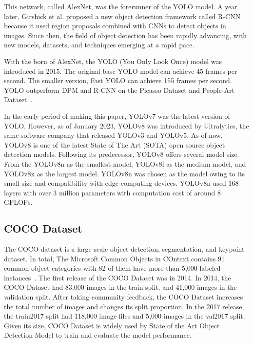 \documentclass[conference]{IEEEtran}
\begin{document}
This network, called AlexNet, was the forerunner of the YOLO model.
A year later, Girshick et al. \@ proposed a new object detection framework called R-CNN~\cite{b3} because it used region proposals combined with CNNs to detect objects in images.
Since then, the field of object detection has been rapidly advancing, with new models, datasets, and techniques emerging at a rapid pace. 

With the born of AlexNet, the YOLO (You Only Look Once) model was introduced in 2015. The original base YOLO model can achieve 45 frames per second.
The smaller version, Fast YOLO can achieve 155 frames per second.
YOLO outperform DPM and R-CNN on the Picasso Dataset and People-Art Dataset~\cite{You Only Look Once}.

In the early period of making this paper, YOLOv7 was the latest version of YOLO\@.
However, as of January 2023, YOLOv8 was introduced by Ultralytics, the same software company that released YOLOv3 and YOLOv5. 
As of now, YOLOv8 is one of the latest State of The Art (SOTA) open source object detection models. Following its predecessor, YOLOv8 offers several model size.
From the YOLOv8n as the smallest model, YOLOv8l as the medium model, and YOLOv8x as the largest model.
YOLOv8n was chosen as the model owing to its small size and compatibility with edge computing devices.
YOLOv8n used 168 layers with over 3 million parameters with computation cost of around 8 GFLOPs.
\subsection{COCO Dataset}\label{AA}
The COCO dataset is a large-scale object detection, segmentation, and keypoint dataset.
In total, The Microsoft Common Objects in COntext contains 91 common object categories with 82 of them have more than 5,000 labeled instances~\cite{COCO Dataset}.
The first release of the COCO Dataset was in 2014. In 2014, the COCO Dataset had 83,000 images in the  train split, and 41,000 images in the validation split.
After taking community feedback, the COCO Dataset increases the total number of images and changes its split proportion. In the 2017 release, the train2017 split had 118,000 image files and 5,000 images in the val2017 split.
Given its size, COCO Dataset is widely used by State of the Art Object Detection Model to train and evaluate the model performance.
\end{document}
